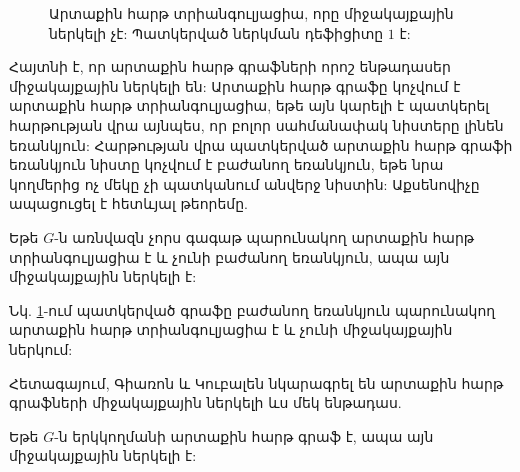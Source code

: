 \begin{figure}
  \begin{center}
  \end{center}
  \caption{Արտաքին հարթ տրիանգուլյացիա, որը միջակայքային ներկելի չէ: Պատկերված ներկման դեֆիցիտը $1$ է:}
  \label{outerplanar-non-colorable}
\end{figure}

Հայտնի է, որ արտաքին հարթ գրաֆների որոշ ենթադասեր միջակայքային ներկելի են: Արտաքին հարթ գրաֆը կոչվում է արտաքին հարթ տրիանգուլյացիա, եթե այն կարելի է պատկերել հարթության վրա այնպես, որ բոլոր սահմանափակ նիստերը լինեն եռանկյուն: Հարթության վրա պատկերված արտաքին հարթ գրաֆի եռանկյուն նիստը կոչվում է բաժանող եռանկյուն, եթե նրա կողմերից ոչ մեկը չի պատկանում անվերջ նիստին: Աքսենովիչը \cite{Axenovich2002} ապացուցել է հետևյալ թեորեմը.

\begin{theorem}
Եթե $G$-ն առնվազն չորս գագաթ պարունակող արտաքին հարթ տրիանգուլյացիա է և չունի բաժանող եռանկյուն, ապա այն միջակայքային ներկելի է:
\end{theorem}

Նկ. \ref{outerplanar-non-colorable}-ում պատկերված գրաֆը բաժանող եռանկյուն պարունակող արտաքին հարթ տրիանգուլյացիա է և չունի միջակայքային ներկում:

Հետագայում, Գիառոն և Կուբալեն \cite{GiaroKubale2004} նկարագրել են արտաքին հարթ գրաֆների միջակայքային ներկելի ևս մեկ ենթադաս.
\begin{theorem}
\label{t2_bipartite_outerplanar}
Եթե $G$-ն երկկողմանի արտաքին հարթ գրաֆ է, ապա այն միջակայքային ներկելի է:
\end{theorem}

